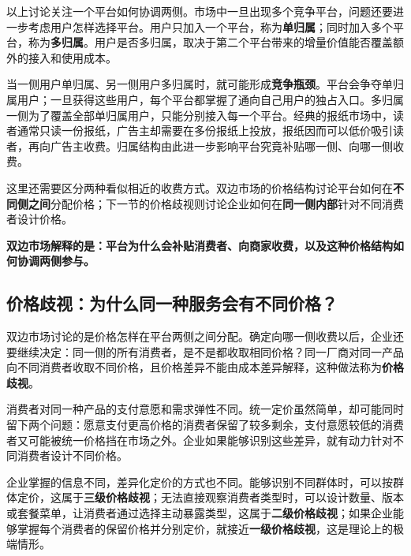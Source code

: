 \documentclass[twoside,10pt,openany]{ctexbook}
\theoremstyle{defstyle}
\newcommand{\important}[1]{{\color{blue}\textbf{#1}}} %
\begin{document}
以上讨论关注一个平台如何协调两侧。市场中一旦出现多个竞争平台，问题还要进一步考虑用户怎样选择平台。用户只加入一个平台，称为\textbf{单归属}；同时加入多个平台，称为\textbf{多归属}。用户是否多归属，取决于第二个平台带来的增量价值能否覆盖额外的接入和使用成本。

当一侧用户单归属、另一侧用户多归属时，就可能形成\textbf{竞争瓶颈}。平台会争夺单归属用户；一旦获得这些用户，每个平台都掌握了通向自己用户的独占入口。多归属一侧为了覆盖全部单归属用户，只能分别接入每一个平台。经典的报纸市场中，读者通常只读一份报纸，广告主却需要在多份报纸上投放，报纸因而可以低价吸引读者，再向广告主收费。归属结构由此进一步影响平台究竟补贴哪一侧、向哪一侧收费。

这里还需要区分两种看似相近的收费方式。双边市场的价格结构讨论平台如何在\textbf{不同侧之间}分配价格；下一节的价格歧视则讨论企业如何在\textbf{同一侧内部}针对不同消费者设计价格。

\begin{center}
\important{双边市场解释的是：平台为什么会补贴消费者、向商家收费，以及这种价格结构如何协调两侧参与。}
\end{center}

\subsection{价格歧视：为什么同一种服务会有不同价格？}

双边市场讨论的是价格怎样在平台两侧之间分配。确定向哪一侧收费以后，企业还要继续决定：同一侧的所有消费者，是不是都收取相同价格？同一厂商对同一产品向不同消费者收取不同价格，且价格差异不能由成本差异解释，这种做法称为\textbf{价格歧视}。

消费者对同一种产品的支付意愿和需求弹性不同。统一定价虽然简单，却可能同时留下两个问题：愿意支付更高价格的消费者保留了较多剩余，支付意愿较低的消费者又可能被统一价格挡在市场之外。企业如果能够识别这些差异，就有动力针对不同消费者设计不同价格。

企业掌握的信息不同，差异化定价的方式也不同。能够识别不同群体时，可以按群体定价，这属于\textbf{三级价格歧视}；无法直接观察消费者类型时，可以设计数量、版本或套餐菜单，让消费者通过选择主动暴露类型，这属于\textbf{二级价格歧视}；如果企业能够掌握每个消费者的保留价格并分别定价，就接近\textbf{一级价格歧视}，这是理论上的极端情形。
\end{document}
